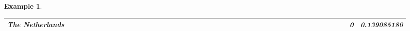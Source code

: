 \documentclass[a4paper,11pt]{report}
\newtheorem{example}[theorem]{Example}
\begin{document}
\begin{example}
\begin{appendices}
\begin{landscape}
\begin{longtable}{r|r|r|r|r|r|r|r|r|r|r|r|r|r|r|r|r|r|r|r|r|r|r|r|r|r|r|r|r|r|r|r|r|r|r|r|r|r|r|r|r|r|r|r|}
\multicolumn{1}{|r|}{\textbf{The Netherlands}}       &                                       &                                       &                                          &                                       &                                       &                                                     &                                        &                                       &                                      &                                       &                                       &                                                &                                       &                                      &                                       &                                       &                                      &                                       &                                       &                                      &                                      &                                         &                                     &                                       &                                      &                                      &                                        &                                       &                                      &                                      &                                        &                                        &                                     &                                      &                                           &                                               &                                      &                                       &                                              &                                      &                                     & 0                                             & 0.139085180                             \\ \hline
\end{longtable}



\end{landscape}
\end{appendices}
\end{example}
\end{document}

